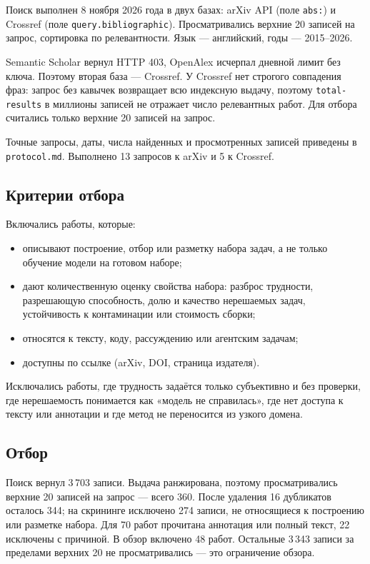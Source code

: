 \documentclass[11pt,a4paper]{article}
\begin{document}
Поиск выполнен 8 ноября 2026 года в двух базах: arXiv API (поле
\texttt{abs:}) и Crossref (поле \texttt{query.bibliographic}). Просматривались
верхние 20 записей на запрос, сортировка по релевантности. Язык —
английский, годы — 2015--2026.

Semantic Scholar вернул HTTP 403, OpenAlex исчерпал дневной лимит без
ключа. Поэтому вторая база — Crossref. У Crossref нет строгого совпадения
фраз: запрос без кавычек возвращает всю индексную выдачу, поэтому
\texttt{total-results} в миллионы записей не отражает число релевантных
работ. Для отбора считались только верхние 20 записей на запрос.

Точные запросы, даты, числа найденных и просмотренных записей приведены в
\texttt{protocol.md}. Выполнено 13 запросов к arXiv и 5 к Crossref.

\subsection{Критерии отбора}

Включались работы, которые:
\begin{itemize}
  \item описывают построение, отбор или разметку набора задач, а не только
        обучение модели на готовом наборе;
  \item дают количественную оценку свойства набора: разброс трудности,
        разрешающую способность, долю и качество нерешаемых задач,
        устойчивость к контаминации или стоимость сборки;
  \item относятся к тексту, коду, рассуждению или агентским задачам;
  \item доступны по ссылке (arXiv, DOI, страница издателя).
\end{itemize}

Исключались работы, где трудность задаётся только субъективно и без
проверки, где нерешаемость понимается как «модель не справилась», где нет
доступа к тексту или аннотации и где метод не переносится из узкого домена.

\subsection{Отбор}

Поиск вернул 3\,703 записи. Выдача ранжирована, поэтому просматривались
верхние 20 записей на запрос — всего 360. После удаления 16 дубликатов
осталось 344; на скрининге исключено 274 записи, не относящиеся к
построению или разметке набора. Для 70 работ прочитана аннотация или полный
текст, 22 исключены с причиной. В обзор включено 48 работ. Остальные 3\,343
записи за пределами верхних 20 не просматривались — это ограничение
обзора.
\end{document}
